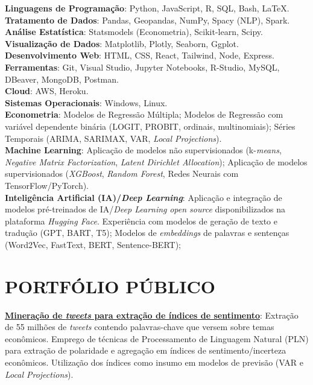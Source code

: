 \documentclass[margin]{res}
\begin{document}
\begin{resume}
\textbf{Linguagens de Programação}: Python, JavaScript, R, SQL, Bash, \LaTeX.
\\
\textbf{Tratamento de Dados}: Pandas, Geopandas, NumPy, Spacy (NLP), Spark.
\\
\textbf{Análise Estatística}: Statsmodels (Econometria), Scikit-learn, Scipy.
\\
\textbf{Visualização de Dados}: Matplotlib, Plotly, Seaborn, Ggplot.
\\
\textbf{Desenvolvimento Web}: HTML, CSS, React, Tailwind, Node, Express.
\\
\textbf{Ferramentas}: Git, Visual Studio, Jupyter Notebooks, R-Studio, MySQL, DBeaver, MongoDB, Postman.
\\
\textbf{Cloud}: AWS, Heroku.
\\
\textbf{Sistemas Operacionais}: Windows, Linux.
\\
\textbf{Econometria}: Modelos de Regressão Múltipla; Modelos de Regressão com variável dependente binária (LOGIT, PROBIT, ordinais, multinomiais); Séries Temporais (ARIMA, SARIMAX, VAR, \textit{Local Projections}).
\\
\textbf{Machine Learning}: Aplicação de modelos não supervisionados (k-\textit{means}, \textit{Negative Matrix Factorization}, \textit{Latent Dirichlet Allocation}); Aplicação de modelos supervisionados (\textit{XGBoost}, \textit{Random Forest}, Redes Neurais com TensorFlow/PyTorch).
\\
\textbf{Inteligência Artificial (IA)/\textit{Deep Learning}}: Aplicação e integração de modelos pré-treinados de IA/\textit{Deep Learning} \textit{open source} disponibilizados na plataforma \textit{Hugging Face}. Experiência com modelos de geração de texto e tradução (GPT, BART, T5); Modelos de \textit{embeddings} de palavras e sentenças (Word2Vec, FastText, BERT, Sentence-BERT);

\section{PORTFÓLIO PÚBLICO}

\href{https://github.com/rsnatorres/phd_thesis}{\textbf{Mineração de \textit{tweets} para extração de índices de sentimento}}: Extração de 55 milhões de \textit{tweets} contendo palavras-chave que versem sobre temas econômicos. Emprego de técnicas de Processamento de Linguagem Natural (PLN) para extração de polaridade e agregação em índices de sentimento/incerteza econômicos. Utilização dos índices como insumo em modelos de previsão (VAR e \textit{Local Projections}).


\end{resume}
\end{document}

